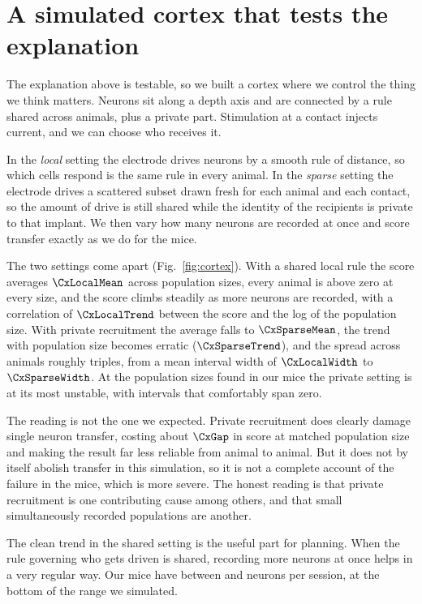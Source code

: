 \documentclass[11pt,letterpaper]{article}
\begin{document}
\section{A simulated cortex that tests the explanation}

The explanation above is testable, so we built a cortex where we control the thing we
think matters. Neurons sit along a depth axis and are connected by a rule shared across
animals, plus a private part. Stimulation at a contact injects current, and we can
choose who receives it.

In the \emph{local} setting the electrode drives neurons by a smooth rule of distance,
so which cells respond is the same rule in every animal. In the \emph{sparse} setting
the electrode drives a scattered subset drawn fresh for each animal and each contact,
so the amount of drive is still shared while the identity of the recipients is private
to that implant. We then vary how many neurons are recorded at once and score transfer
exactly as we do for the mice.

The two settings come apart (Fig.~\ref{fig:cortex}). With a shared local rule the score
averages $\CxLocalMean$ across population sizes, every animal is above zero at every
size, and the score climbs steadily as more neurons are recorded, with a correlation of
$\CxLocalTrend$ between the score and the log of the population size. With private
recruitment the average falls to $\CxSparseMean$, the trend with population size becomes
erratic ($\CxSparseTrend$), and the spread across animals roughly triples, from a mean
interval width of $\CxLocalWidth$ to $\CxSparseWidth$. At the population sizes found in
our mice the private setting is at its most unstable, with intervals that comfortably
span zero.

The reading is not the one we expected. Private
recruitment does clearly damage single neuron transfer, costing about $\CxGap$ in score
at matched population size and making the result far less reliable from animal to
animal. But it does not by itself abolish transfer in this simulation, so it is not a
complete account of the failure in the mice, which is more severe. The honest reading is
that private recruitment is one contributing cause among others, and that small
simultaneously recorded populations are another.

The clean trend in the shared setting is the useful part for planning. When the rule
governing who gets driven is shared, recording more neurons at once helps in a very
regular way. Our mice have between \MinUnits{} and \MaxUnits{} neurons per session, at
the bottom of the range we simulated.
\end{document}
